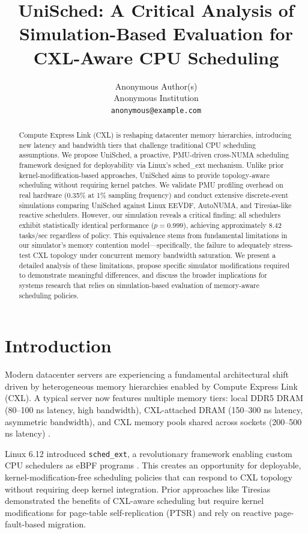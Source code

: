 \documentclass[11pt]{article}
\title{UniSched: A Critical Analysis of Simulation-Based Evaluation for CXL-Aware CPU Scheduling}
\author{
  Anonymous Author(s) \\
  Anonymous Institution \\
  \texttt{anonymous@example.com}
}
\begin{document}
\maketitle

\begin{abstract}
Compute Express Link (CXL) is reshaping datacenter memory hierarchies, introducing new latency and bandwidth tiers that challenge traditional CPU scheduling assumptions. We propose UniSched, a proactive, PMU-driven cross-NUMA scheduling framework designed for deployability via Linux's sched_ext mechanism. Unlike prior kernel-modification-based approaches, UniSched aims to provide topology-aware scheduling without requiring kernel patches. We validate PMU profiling overhead on real hardware (0.35\% at 1\% sampling frequency) and conduct extensive discrete-event simulations comparing UniSched against Linux EEVDF, AutoNUMA, and Tiresias-like reactive schedulers. However, our simulation reveals a critical finding: all schedulers exhibit statistically identical performance ($p=0.999$), achieving approximately 8.42 tasks/sec regardless of policy. This equivalence stems from fundamental limitations in our simulator's memory contention model---specifically, the failure to adequately stress-test CXL topology under concurrent memory bandwidth saturation. We present a detailed analysis of these limitations, propose specific simulator modifications required to demonstrate meaningful differences, and discuss the broader implications for systems research that relies on simulation-based evaluation of memory-aware scheduling policies.
\end{abstract}

\section{Introduction}

Modern datacenter servers are experiencing a fundamental architectural shift driven by heterogeneous memory hierarchies enabled by Compute Express Link (CXL). A typical server now features multiple memory tiers: local DDR5 DRAM (80--100 ns latency, high bandwidth), CXL-attached DRAM (150--300 ns latency, asymmetric bandwidth), and CXL memory pools shared across sockets (200--500 ns latency) \citep{li2023pond, almaruf2023tpp}.

Linux 6.12 introduced \texttt{sched_ext}, a revolutionary framework enabling custom CPU schedulers as eBPF programs \citep{vernet2024schedext}. This creates an opportunity for deployable, kernel-modification-free scheduling policies that can respond to CXL topology without requiring deep kernel integration. Prior approaches like Tiresias \citep{tang2024tiresias} demonstrated the benefits of CXL-aware scheduling but require kernel modifications for page-table self-replication (PTSR) and rely on reactive page-fault-based migration.
\end{document}
